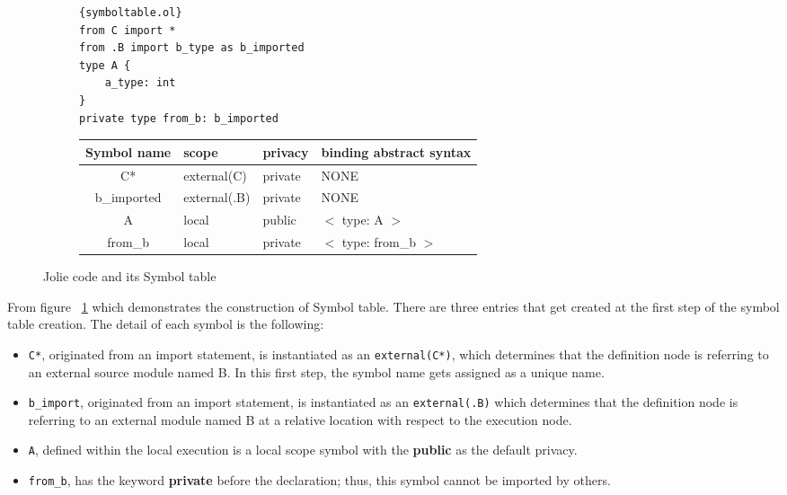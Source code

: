 \begin{figure}[ht]
    \begin{subfigure}[b]{\textwidth}
        \lstset{language=Jolie,
            style=codeStyle,
            numbers=left,
            firstnumber=1
        }
        \begin{lstlisting}[frame=tlrb,
            basicstyle=\footnotesize]{symboltable.ol}
from C import *
from .B import b_type as b_imported
type A {
    a_type: int
}
private type from_b: b_imported
\end{lstlisting}
    \end{subfigure}
    \begin{subfigure}[b]{\textwidth}
        \begin{tabular}{ |c|l|l|l| }
            \hline
            Symbol name & scope        & privacy & binding abstract syntax \\
            \hline
            C*          & external(C)  & private & NONE                    \\
            b_imported  & external(.B) & private & NONE                    \\
            A           & local        & public  & $<$ type: A $>$         \\
            from_b      & local        & private & $<$ type: from_b $>$    \\
            \hline
        \end{tabular}
    \end{subfigure}
    \caption{Jolie code and its Symbol table}
    \label{fig:jolie-ex-symbol-table}
\end{figure}

From figure ~\ref{fig:jolie-ex-symbol-table} which demonstrates the construction of Symbol table.
There are three entries that get created at the first step of the symbol table creation. The detail of each symbol is the following:

\begin{itemize}
    \item \texttt{C*}, originated from an import statement, is instantiated as an \texttt{external(C*)}, which determines that the definition node is referring to an external source module named B. In this first step, the symbol name gets assigned as a unique name.
    \item \texttt{b_import}, originated from an import statement, is instantiated as an \texttt{external(.B)} which determines that the definition node is referring to an external module named B at a relative location with respect to the execution node.
    \item \texttt{A}, defined within the local execution is a local scope symbol with the \textbf{public} as the default privacy.
    \item \texttt{from_b}, has the keyword \textbf{private} before the declaration; thus, this symbol cannot be imported by others.
\end{itemize}

